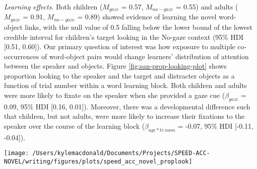 \documentclass[10pt, letterpaper]{article}
\newenvironment{CodeChunk}{}{}
\begin{document}
\emph{Learning effects.} Both children (\(M_{gaze}\) = 0.57,
\(M_{no-gaze}\) = 0.55) and adults (\(M_{gaze}\) = 0.91, \(M_{no-gaze}\)
= 0.89) showed evidence of learning the novel word-object links, with
the null value of 0.5 falling below the lower bound of the lowest
credible interval for children's target looking in the No-gaze context
(95\% HDI {[}0.51, 0.60{]}). Our primary question of interest was how
exposure to multiple co-occurrences of word-object pairs would change
learners' distribution of attention between the speaker and objects.
Figure \ref{fig:san-prop-looking-plot} shows proportion looking to the
speaker and the target and distracter objects as a function of trial
number within a word learning block. Both children and adults were more
likely to fixate on the speaker when she provided a gaze cue
(\(\beta_{gaze}\) = 0.09, 95\% HDI {[}0.16, 0.01{]}). Moreover, there
was a developmental difference such that children, but not adults, were
more likely to increase their fixations to the speaker over the course
of the learning block (\(\beta_{age*tr.num}\) = -0.07, 95\% HDI
{[}-0.11, -0.04{]}).

\begin{CodeChunk}
\begin{figure*}[t]

{\centering \texttt{[image: /Users/kylemacdonald/Documents/Projects/SPEED-ACC-NOVEL/writing/figures/plots/speed\_acc\_novel\_proplook]} 

}

\caption[Panel A shows participants’ tendency to look at the speaker on exposure and test trials as a function of the trial number within a learning block]{Panel A shows participants’ tendency to look at the speaker on exposure and test trials as a function of the trial number within a learning block. The horizontal, dashed line represents the tendency to distribute attention equally across the three AOIs. Color indicates gaze condition and error bars represent 95\% credible intervals. Panel B shows the same information but for target and distracter looking across the learning block (left) and aggregated over all trials (right).}\label{fig:san-prop-looking-plot}
\end{figure*}
\end{CodeChunk}
\end{document}
